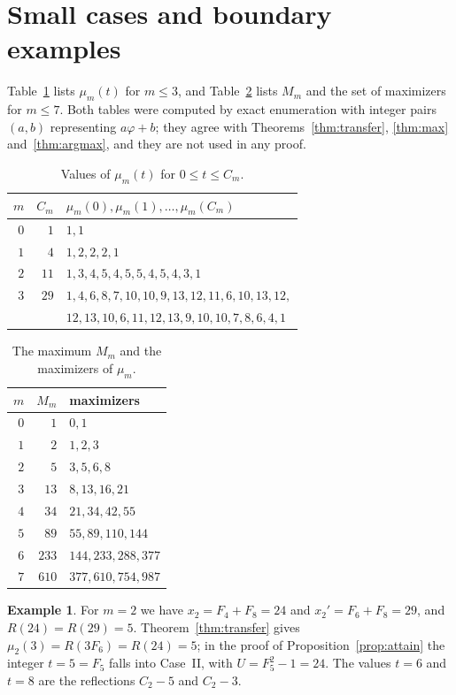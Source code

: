 \documentclass[11pt]{amsart}
\theoremstyle{definition}
\newtheorem{example}[theorem]{Example}
\theoremstyle{remark}
\numberwithin{equation}{section}
\begin{document}
\section{Small cases and boundary examples}\label{sec:examples}

Table~\ref{tab:small} lists $\mu_m(t)$ for $m\le3$, and Table~\ref{tab:max} lists $M_m$ and the set
of maximizers for $m\le7$. Both tables were computed by exact enumeration with integer pairs
$(a,b)$ representing $a\varphi+b$; they agree with Theorems~\ref{thm:transfer}, \ref{thm:max}
and~\ref{thm:argmax}, and they are not used in any proof.

\begin{table}[ht]
\caption{Values of $\mu_m(t)$ for $0\le t\le C_m$.}\label{tab:small}
\centering
\begin{tabular}{@{}rrl@{}}
\toprule
$m$ & $C_m$ & $\mu_m(0),\mu_m(1),\dots,\mu_m(C_m)$\\
\midrule
$0$ & $1$ & $1,1$\\
$1$ & $4$ & $1,2,2,2,1$\\
$2$ & $11$ & $1,3,4,5,4,5,5,4,5,4,3,1$\\
$3$ & $29$ & $1,4,6,8,7,10,10,9,13,12,11,6,10,13,12,$\\
    &      & $12,13,10,6,11,12,13,9,10,10,7,8,6,4,1$\\
\bottomrule
\end{tabular}
\end{table}

\begin{table}[ht]
\caption{The maximum $M_m$ and the maximizers of $\mu_m$.}\label{tab:max}
\centering
\begin{tabular}{@{}rrl@{}}
\toprule
$m$ & $M_m$ & maximizers\\
\midrule
$0$ & $1$ & $0,1$\\
$1$ & $2$ & $1,2,3$\\
$2$ & $5$ & $3,5,6,8$\\
$3$ & $13$ & $8,13,16,21$\\
$4$ & $34$ & $21,34,42,55$\\
$5$ & $89$ & $55,89,110,144$\\
$6$ & $233$ & $144,233,288,377$\\
$7$ & $610$ & $377,610,754,987$\\
\bottomrule
\end{tabular}
\end{table}

\begin{example}
For $m=2$ we have $x_2=F_4+F_8=24$ and $x_2'=F_6+F_8=29$, and $R(24)=R(29)=5$. Theorem~\ref{thm:transfer}
gives $\mu_2(3)=R(3F_6)=R(24)=5$; in the proof of Proposition~\ref{prop:attain} the integer
$t=5=F_5$ falls into Case~II, with $U=F_5^2-1=24$. The values $t=6$ and $t=8$ are the reflections
$C_2-5$ and $C_2-3$.
\end{example}
\end{document}
